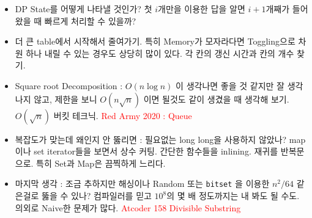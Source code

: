 \documentclass[9pt, a4paper, notitlepage]{extreport}
\begin{document}
\begin{multicols*}{2}
\begin{itemize}
		\item DP State를 어떻게 나타낼 것인가? 첫 $i$개만을 이용한 답을 알면 $i+1$개째가 들어왔을 때 빠르게 처리할 수 있을까?
		\item 더 큰 table에서 시작해서 줄여가기. 특히 Memory가 모자라다면 Toggling으로 차원 하나 내릴 수 있는 경우도 상당히 많이 있다. 각 칸의 갱신 시간과 칸의 개수 찾기.
		\item Square root Decomposition : $O(n \log n)$ 이 생각나면 좋을 것 같지만 잘 생각나지 않고, 제한을 보니 $O(n \sqrt{n})$ 이면 될것도 같이 생겼을 때 생각해 보기. $O(\sqrt{n})$ 버킷 테크닉. \textcolor{red}{Red Army 2020 : Queue}
		\item 복잡도가 맞는데 왜인지 안 뚫리면 : 필요없는 long long을 사용하지 않았나? map이나 set iterator들을 보면서 상수 커팅. 간단한 함수들을 inlining. 재귀를 반복문으로. 특히 Set과 Map은 끔찍하게 느리다.
		\item 마지막 생각 : 조금 추하지만 해싱이나 Random 또는 \texttt{bitset} 을 이용한 $n^2 / 64$ 같은걸로 뚫을 수 있나? 컴파일러를 믿고 $10^8$의 몇 배 정도까지는 내 봐도 될 수도. 의외로 Naive한 문제가 많다. \textcolor{red}{Atcoder 158 Divisible Substring}
	\end{itemize}

		\end{multicols*}
\end{document}
